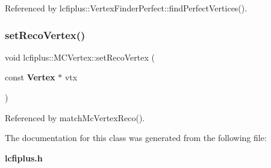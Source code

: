 Referenced by lcfiplus\+::\+Vertex\+Finder\+Perfect\+::find\+Perfect\+Vertices().

\mbox{\label{classlcfiplus_1_1MCVertex_a48ca68400f75f304e083eedda426f50a}} 
\subsubsection{set\+Reco\+Vertex()}
{\footnotesize\ttfamily void lcfiplus\+::\+M\+C\+Vertex\+::set\+Reco\+Vertex (\begin{DoxyParamCaption}\item[{const \textbf{ Vertex} $\ast$}]{vtx }\end{DoxyParamCaption})\hspace{0.3cm}{\ttfamily [inline]}}



Referenced by match\+Mc\+Vertex\+Reco().



The documentation for this class was generated from the following file\+:\begin{DoxyCompactItemize}
\item 
\textbf{ lcfiplus.\+h}\end{DoxyCompactItemize}

